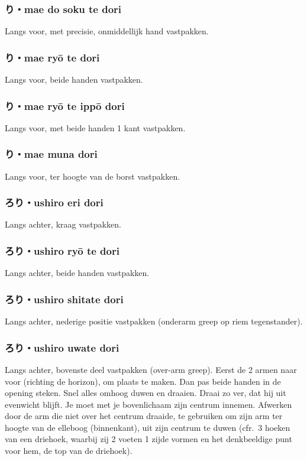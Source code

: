 \subsubsection{り・mae do soku te dori}
Langs voor, met precisie, onmiddellijk hand vastpakken.

\subsubsection{り・mae ry\={o} te dori}
Langs voor, beide handen vastpakken.

\subsubsection{り・mae ry\={o} te ipp\={o} dori}
Langs voor, met beide handen 1 kant vastpakken.

\subsubsection{り・mae muna dori}
Langs voor, ter hoogte van de borst vastpakken.

\subsubsection{ろり・ushiro eri dori}
Langs achter, kraag vastpakken.

\subsubsection{ろり・ushiro ry\={o} te dori}
Langs achter, beide handen vastpakken.

\subsubsection{ろり・ushiro shitate dori}
Langs achter, nederige positie vastpakken (onderarm greep op riem tegenstander).

\subsubsection{ろり・ushiro uwate dori}
Langs achter, bovenste deel vastpakken (over-arm greep). Eerst de 2 armen naar voor (richting de horizon), om plaats te maken. Dan pas beide handen in de opening steken. Snel alles omhoog duwen en draaien. Draai zo ver, dat hij uit evenwicht blijft. Je moet met je bovenlichaam zijn centrum innemen. Afwerken door de arm die niet over het centrum draaide, te gebruiken om zijn arm ter hoogte van de elleboog (binnenkant), uit zijn centrum te duwen (cfr.\ 3 hoeken van een driehoek, waarbij zij 2 voeten 1 zijde vormen en het denkbeeldige punt voor hem, de top van de driehoek).

